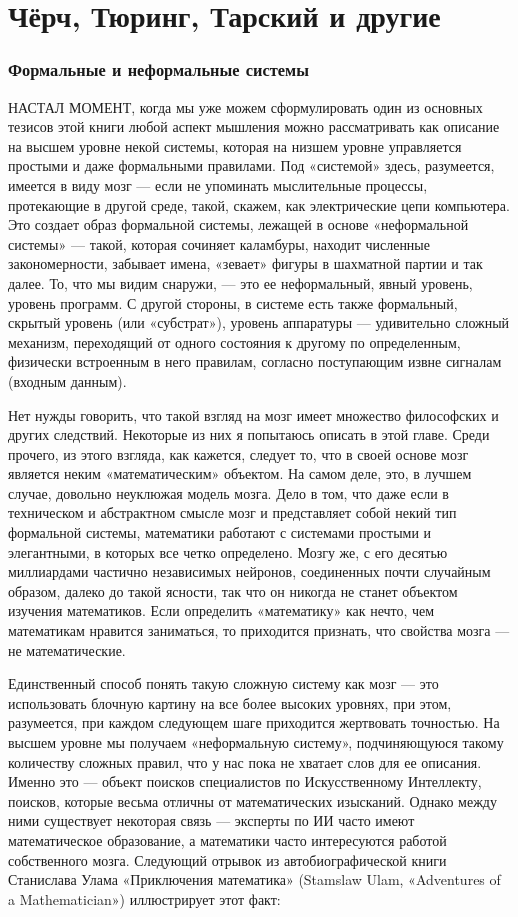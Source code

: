 \documentclass[../main.tex]{subfiles}
\begin{document}
\chapter{Чёрч, Тюринг, Тарский и другие}

\subsection{Формальные и неформальные системы}

НАСТАЛ МОМЕНТ, когда мы уже можем сформулировать один из основных тезисов этой книги любой аспект мышления можно рассматривать как описание на высшем уровне некой системы, которая на низшем уровне управляется простыми и даже формальными правилами. Под «системой» здесь, разумеется, имеется в виду мозг --- если не упоминать мыслительные процессы, протекающие в другой среде, такой, скажем, как электрические цепи компьютера. Это создает образ формальной системы, лежащей в основе «неформальной системы» --- такой, которая сочиняет каламбуры, находит численные закономерности, забывает имена, «зевает» фигуры в шахматной партии и так далее. То, что мы видим снаружи, --- это ее неформальный, явный уровень, уровень программ. С другой стороны, в системе есть также формальный, скрытый уровень (или «субстрат»), уровень аппаратуры --- удивительно сложный механизм, переходящий от одного состояния к другому по определенным, физически встроенным в него правилам, согласно поступающим извне сигналам (входным данным).

Нет нужды говорить, что такой взгляд на мозг имеет множество философских и других следствий. Некоторые из них я попытаюсь описать в этой главе. Среди прочего, из этого взгляда, как кажется, следует то, что в своей основе мозг является неким «математическим» объектом. На самом деле, это, в лучшем случае, довольно неуклюжая модель мозга. Дело в том, что даже если в техническом и абстрактном смысле мозг и представляет собой некий тип формальной системы, математики работают с системами простыми и элегантными, в которых все четко определено. Мозгу же, с его десятью миллиардами частично независимых нейронов, соединенных почти случайным образом, далеко до такой ясности, так что он никогда не станет объектом изучения математиков. Если определить «математику» как нечто, чем математикам нравится заниматься, то приходится признать, что свойства мозга --- не математические.

Единственный способ понять такую сложную систему как мозг --- это использовать блочную картину на все более высоких уровнях, при этом, разумеется, при каждом следующем шаге приходится жертвовать точностью. На высшем уровне мы получаем «неформальную систему», подчиняющуюся такому количеству сложных правил, что у нас пока не хватает слов для ее описания. Именно это --- объект поисков специалистов по Искусственному Интеллекту, поисков, которые весьма отличны от математических изысканий. Однако между ними существует некоторая связь --- эксперты по ИИ часто имеют математическое образование, а математики часто интересуются работой собственного мозга. Следующий отрывок из автобиографической книги Станислава Улама «Приключения математика» (Stamslaw Ulam, «Adventures of a Mathematician») иллюстрирует этот факт:
\end{document}
